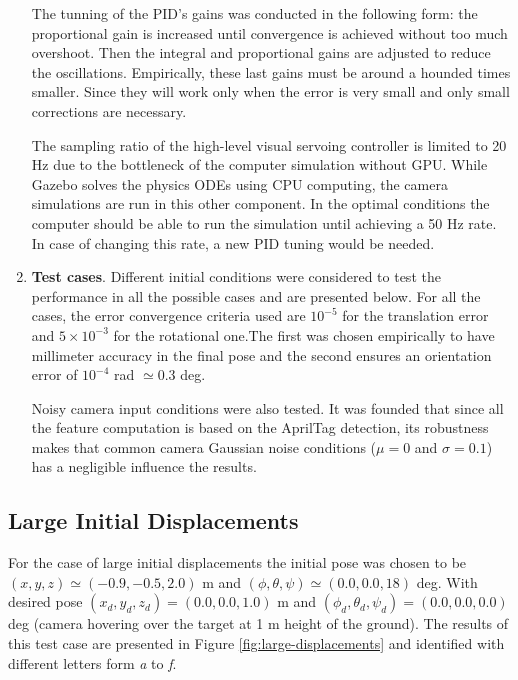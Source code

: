 \begin{enumerate}
	The tunning of the PID's gains was conducted in the following form: the proportional gain is increased until convergence is achieved without too much overshoot. Then the integral and proportional gains are adjusted to reduce the oscillations. Empirically, these last gains must be around a hounded times smaller. Since they will work only when the error is very small and only small corrections are necessary.
	
	The sampling ratio of the high-level visual servoing controller is limited to 20 Hz due to the bottleneck of the computer simulation without GPU. While Gazebo solves the physics ODEs using CPU computing, the camera simulations are run in this other component. In the optimal conditions the computer should be able to run the simulation until achieving a 50 Hz rate. In case of changing this rate, a new PID tuning would be needed.
	
	
	\item \textbf{Test cases}. Different initial conditions were considered to test the performance in all the possible cases and are presented below. For all the cases, the error convergence criteria used are $10^{-5}$ for the translation error and $5\times 10^{-3}$ for the rotational one.The first was chosen empirically to have millimeter accuracy in the final pose and the second ensures an orientation error of $10^{-4}$ rad $\simeq 0.3$ deg.
	
	Noisy camera input conditions were also tested. It was founded that since all the feature computation is based on the AprilTag detection, its robustness makes that common camera Gaussian noise conditions ($\mu = 0$ and $\sigma = 0.1$) has a negligible influence the results.
\end{enumerate}

\subsection{Large Initial Displacements}
\label{sec:large-initial-displacements}

For the case of large initial displacements the initial pose was chosen to be $(x, y, z) \simeq (-0.9, -0.5, 2.0)$ m and $(\phi, \theta, \psi) \simeq (0.0, 0.0, 18)$ deg. With desired pose $(x_d, y_d, z_d) = (0.0, 0.0, 1.0)$ m and $(\phi_d, \theta_d, \psi_d) = (0.0, 0.0, 0.0)$ deg (camera hovering over the target at 1 m height of the ground). The results of this test case are presented in Figure \ref{fig:large-displacements} and identified with different letters form \emph{a} to \emph{f}.

